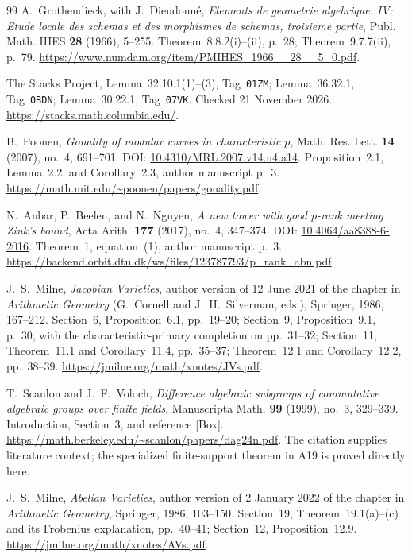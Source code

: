 \begin{thebibliography}{99}
A.~Grothendieck, with J.~Dieudonn\'e, \emph{Elements de geometrie
algebrique. IV: Etude locale des schemas et des morphismes de
schemas, troisieme partie}, Publ. Math. IHES \textbf{28} (1966),
5--255. Theorem~8.8.2(i)--(ii), p.~28; Theorem~9.7.7(ii), p.~79.
\url{https://www.numdam.org/item/PMIHES_1966__28__5_0.pdf}.

The Stacks Project, Lemma~32.10.1(1)--(3), Tag~\texttt{01ZM};
Lemma~36.32.1, Tag~\texttt{0BDN}; Lemma~30.22.1,
Tag~\texttt{07VK}. Checked 21 November 2026.
\url{https://stacks.math.columbia.edu/}.

B.~Poonen,
\emph{Gonality of modular curves in characteristic $p$},
Math. Res. Lett. \textbf{14} (2007), no.~4, 691--701.
DOI: \href{https://doi.org/10.4310/MRL.2007.v14.n4.a14}{10.4310/MRL.2007.v14.n4.a14}.
Proposition~2.1, Lemma~2.2, and Corollary~2.3, author manuscript p.~3.
\url{https://math.mit.edu/~poonen/papers/gonality.pdf}.

N.~Anbar, P.~Beelen, and N.~Nguyen,
\emph{A new tower with good $p$-rank meeting Zink's bound},
Acta Arith. \textbf{177} (2017), no.~4, 347--374.
DOI: \href{https://doi.org/10.4064/aa8388-6-2016}{10.4064/aa8388-6-2016}.
Theorem~1, equation~(1), author manuscript p.~3.
\url{https://backend.orbit.dtu.dk/ws/files/123787793/p_rank_abn.pdf}.

J.~S.~Milne, \emph{Jacobian Varieties}, author version of
12 June 2021 of the chapter in \emph{Arithmetic Geometry}
(G.~Cornell and J.~H.~Silverman, eds.), Springer, 1986, 167--212.
Section~6, Proposition~6.1, pp.~19--20;
Section~9, Proposition~9.1, p.~30, with the characteristic-primary
completion on pp.~31--32; Section~11, Theorem~11.1 and
Corollary~11.4, pp.~35--37;
Theorem~12.1 and Corollary~12.2, pp.~38--39.
\url{https://jmilne.org/math/xnotes/JVs.pdf}.

T.~Scanlon and J.~F.~Voloch,
\emph{Difference algebraic subgroups of commutative algebraic
groups over finite fields},
Manuscripta Math. \textbf{99} (1999), no.~3, 329--339.
Introduction, Section~3, and reference \textnormal{[Box]}.
\url{https://math.berkeley.edu/~scanlon/papers/dag24n.pdf}.
The citation supplies literature context; the specialized
finite-support theorem in A19 is proved directly here.


J.~S.~Milne, \emph{Abelian Varieties}, author version of
2 January 2022 of the chapter in \emph{Arithmetic Geometry},
Springer, 1986, 103--150.
Section~19, Theorem~19.1(a)--(c) and its Frobenius explanation,
pp.~40--41; Section~12, Proposition~12.9.
\url{https://jmilne.org/math/xnotes/AVs.pdf}.



\end{thebibliography}
